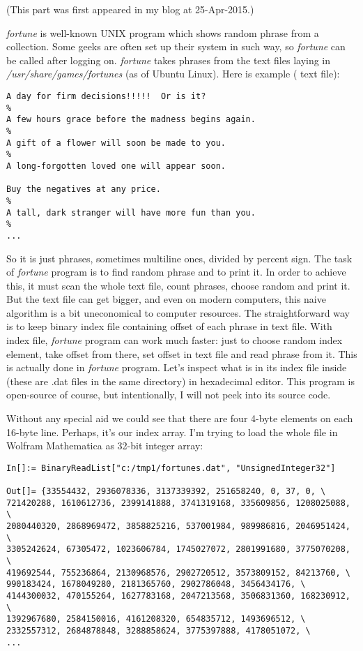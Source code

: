 
(This part was first appeared in my blog at 25-Apr-2015.)

\emph{fortune} is well-known UNIX program which shows random phrase from a collection.
Some geeks are often set up their system in such way, so \emph{fortune} can be called after logging on.
\emph{fortune} takes phrases from the text files laying in \emph{/usr/share/games/fortunes} (as of Ubuntu Linux).
Here is example ( text file):

\begin{lstlisting}
A day for firm decisions!!!!!  Or is it?
%
A few hours grace before the madness begins again.
%
A gift of a flower will soon be made to you.
%
A long-forgotten loved one will appear soon.

Buy the negatives at any price.
%
A tall, dark stranger will have more fun than you.
%
...
\end{lstlisting}

So it is just phrases, sometimes multiline ones, divided by percent sign.
The task of \emph{fortune} program is to find random phrase and to print it.
In order to achieve this, it must scan the whole text file, count phrases, choose random and print it.
But the text file can get bigger, and even on modern computers, this naive algorithm is a bit uneconomical to computer resources.
The straightforward way is to keep binary index file containing offset of each phrase in text file.
With index file, \emph{fortune} program can work much faster: just to choose random index element, take offset from there, set offset in text file and read phrase from it.
This is actually done in \emph{fortune} program.
Let's inspect what is in its index file inside (these are .dat files in the same directory) in hexadecimal editor.
This program is open-source of course, but intentionally, I will not peek into its source code.



Without any special aid we could see that there are four 4-byte elements on each 16-byte line.
Perhaps, it's our index array.
I'm trying to load the whole file in Wolfram Mathematica as 32-bit integer array:

\begin{lstlisting}[style=custommath]
In[]:= BinaryReadList["c:/tmp1/fortunes.dat", "UnsignedInteger32"]

Out[]= {33554432, 2936078336, 3137339392, 251658240, 0, 37, 0, \
721420288, 1610612736, 2399141888, 3741319168, 335609856, 1208025088, \
2080440320, 2868969472, 3858825216, 537001984, 989986816, 2046951424, \
3305242624, 67305472, 1023606784, 1745027072, 2801991680, 3775070208, \
419692544, 755236864, 2130968576, 2902720512, 3573809152, 84213760, \
990183424, 1678049280, 2181365760, 2902786048, 3456434176, \
4144300032, 470155264, 1627783168, 2047213568, 3506831360, 168230912, \
1392967680, 2584150016, 4161208320, 654835712, 1493696512, \
2332557312, 2684878848, 3288858624, 3775397888, 4178051072, \
...
\end{lstlisting}

